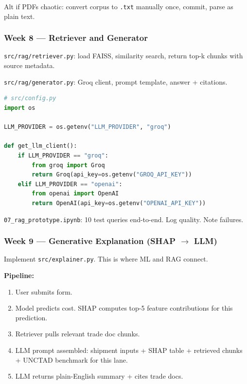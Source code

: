 \documentclass[11pt, a4paper]{article}
\begin{document}
Alt if PDFs chaotic: convert corpus to \texttt{.txt} manually once, commit, parse as plain text.

\subsubsection*{Week 8 --- Retriever and Generator}

\texttt{src/rag/retriever.py}: load FAISS, similarity search, return top-k chunks with source metadata.

\texttt{src/rag/generator.py}: Groq client, prompt template, answer + citations.

\begin{lstlisting}[language=Python]
# src/config.py
import os

LLM_PROVIDER = os.getenv("LLM_PROVIDER", "groq")

def get_llm_client():
    if LLM_PROVIDER == "groq":
        from groq import Groq
        return Groq(api_key=os.getenv("GROQ_API_KEY"))
    elif LLM_PROVIDER == "openai":
        from openai import OpenAI
        return OpenAI(api_key=os.getenv("OPENAI_API_KEY"))
\end{lstlisting}

\texttt{07\_rag\_prototype.ipynb}: 10 test queries end-to-end. Log quality. Note failures.

\subsubsection*{Week 9 --- Generative Explanation (SHAP $\rightarrow$ LLM)}

Implement \texttt{src/explainer.py}. This is where ML and RAG connect.

\textbf{Pipeline:}
\begin{enumerate}
  \item User submits form.
  \item Model predicts cost. SHAP computes top-5 feature contributions for this prediction.
  \item Retriever pulls relevant trade doc chunks.
  \item LLM prompt assembled: shipment inputs + SHAP table + retrieved chunks + UNCTAD benchmark for this lane.
  \item LLM returns plain-English summary + cites trade docs.
\end{enumerate}
\end{document}
